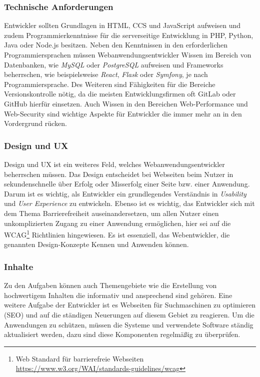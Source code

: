 \subsubsection{Technische Anforderungen}
Entwickler sollten Grundlagen in HTML, CCS und JavaScript aufweisen und zudem Programmierkenntnisse für die serverseitige Entwicklung in PHP, Python, Java oder Node.js besitzen. Neben den Kenntnissen in den erforderlichen Programmiersprachen müssen Webanwendungsentwickler Wissen im Bereich von Datenbanken, wie \textit{MySQL} oder \textit{PostgreSQL} aufweisen und Frameworks beherrschen, wie beispielsweise \textit{React}, \textit{Flask} oder \textit{Symfony}, je nach Programmiersprache. Des Weiteren sind Fähigkeiten für die Bereiche Versionskontrolle nötig, da die meisten Entwicklungsfirmen oft GitLab oder GitHub hierfür einsetzen. Auch Wissen in den Bereichen Web-Performance und Web-Security sind wichtige Aspekte für Entwickler die immer mehr an in den Vordergrund rücken. 


\subsubsection{Design und UX}
Design und UX ist ein weiteres Feld, welches Webanwendungsentwickler beherrschen müssen. Das Design entscheidet bei Webseiten beim Nutzer in sekundenschnelle über Erfolg oder Misserfolg einer Seite bzw. einer Anwendung. Darum ist es wichtig, als Entwickler ein grundlegendes Verständnis in \textit{Usability} und \textit{User Experience} zu entwickeln. Ebenso ist es wichtig, das Entwickler sich mit dem Thema Barrierefreiheit auseinandersetzen, um allen Nutzer einen unkomplizierten Zugang zu einer Anwendung ermöglichen, hier sei auf die WCAG\footnote{Web Standard für barrierefreie Webseiten \href{https://www.w3.org/WAI/standards-guidelines/wcag}{https://www.w3.org/WAI/standards-guidelines/wcag}} Richtlinien hingewiesen. Es ist essenziell, das Webentwickler, die genannten Design-Konzepte Kennen und Anwenden können.


\subsubsection{Inhalte}
Zu den Aufgaben können auch Themengebiete wie die Erstellung von hochwertigem Inhalten die informativ und ansprechend sind gehören. Eine weitere Aufgabe der Entwickler ist es Webseiten für Suchmaschinen zu optimieren (SEO) und auf die ständigen Neuerungen auf diesem Gebiet zu reagieren. Um die Anwendungen zu schützen, müssen die Systeme und verwendete Software ständig aktualisiert werden, dazu sind diese Komponenten regelmäßig zu überprüfen.


